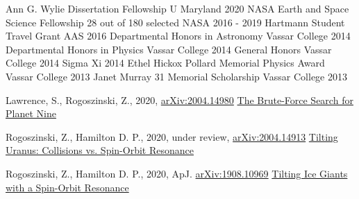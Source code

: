 \documentclass[]{awesome-cv}
\begin{document}
\vspace{-2mm}

\begin{cvhonors}
	\cvhonor
	{Ann G. Wylie Dissertation Fellowship}
	{}
	{U Maryland}
	{2020}
	\cvhonor
	{NASA Earth and Space Science Fellowship}
	{28 out of 180 selected}
	{NASA}
	{2016 - 2019}
	\cvhonor
	{Hartmann Student Travel Grant}
	{}
	{AAS}
	{2016}
	\cvhonor
	{Departmental Honors in Astronomy}
	{}
	{Vassar College}
	{2014}
	\cvhonor
	{Departmental Honors in Physics}
	{}
	{Vassar College}
	{2014}
	\cvhonor
	{General Honors}
	{}
	{Vassar College}
	{2014}
	\cvhonor
	{Sigma Xi}
	{}
	{}
	{2014}
	\cvhonor
	{Ethel Hickox Pollard Memorial Physics Award}
	{}
	{Vassar College}
	{2013}
	\cvhonor
	{Janet Murray \textquotesingle{}31 Memorial Scholarship}
	{}
	{Vassar College}
	{2013}
\end{cvhonors}

\vspace{-2mm}
\begin{cventries}
	\cventry
	{Lawrence, S., Rogoszinski, Z., 2020, \href{https://arxiv.org/pdf/2004.14980.pdf}{arXiv:2004.14980}}
	{\href{https://ui.adsabs.harvard.edu/abs/2020arXiv200414980L/abstract}{The Brute-Force Search for Planet Nine}}
	{}
	{}
	{}
	
	\vspace{-5mm}
	\cventry
	{Rogoszinski, Z., Hamilton D. P., 2020, under review, \href{https://arxiv.org/pdf/2004.14913.pdf}{arXiv:2004.14913}}
	{\href{https://ui.adsabs.harvard.edu/abs/2020arXiv200414913R/abstract}{Tilting Uranus: Collisions vs. Spin-Orbit Resonance}}
	{}
	{}
	{}
	
	
	\vspace{-5mm}
	\cventry
	{Rogoszinski, Z., Hamilton D. P., 2020, ApJ. \href{https://arxiv.org/pdf/1908.10969.pdf}{arXiv:1908.10969}}
	{\href{https://ui.adsabs.harvard.edu/abs/2020ApJ...888...60R/abstract}{Tilting Ice Giants with a Spin-Orbit Resonance}}
	{}
	{}
	{}
	
	\vspace{-7mm}
\end{cventries}
\end{document}
